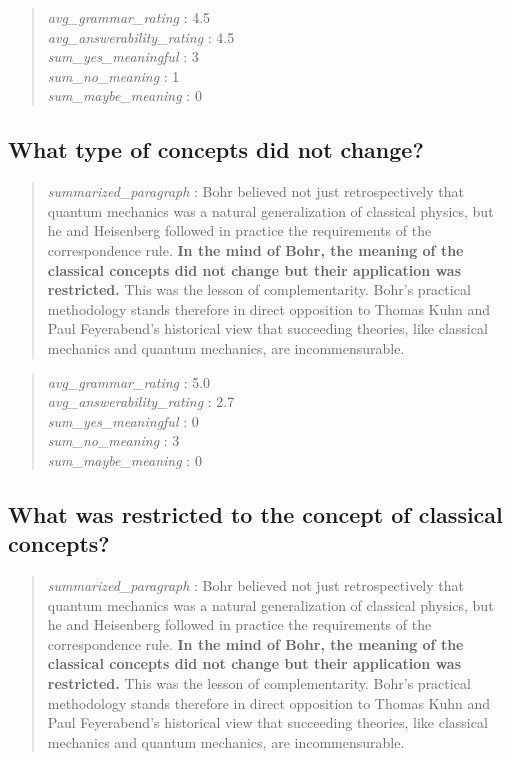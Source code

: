 \begin{quote}
\emph{avg\_grammar\_rating} : 4.5\\
\emph{avg\_answerability\_rating} : 4.5\\
\emph{sum\_yes\_meaningful} : 3\\
\emph{sum\_no\_meaning} : 1\\
\emph{sum\_maybe\_meaning} : 0
\end{quote}

\hypertarget{what-type-of-concepts-did-not-change}{%
\subsection{What type of concepts did not
change?}\label{what-type-of-concepts-did-not-change}}

\begin{quote}
\emph{summarized\_paragraph} : Bohr believed not just retrospectively
that quantum mechanics was a natural generalization of classical
physics, but he and Heisenberg followed in practice the requirements of
the correspondence rule. \textbf{In the mind of Bohr, the meaning of the
classical concepts did not change but their application was restricted.}
This was the lesson of complementarity. Bohr's practical methodology
stands therefore in direct opposition to Thomas Kuhn and Paul
Feyerabend's historical view that succeeding theories, like classical
mechanics and quantum mechanics, are incommensurable.
\end{quote}

\begin{quote}
\emph{avg\_grammar\_rating} : 5.0\\
\emph{avg\_answerability\_rating} : 2.7\\
\emph{sum\_yes\_meaningful} : 0\\
\emph{sum\_no\_meaning} : 3\\
\emph{sum\_maybe\_meaning} : 0
\end{quote}

\hypertarget{what-was-restricted-to-the-concept-of-classical-concepts}{%
\subsection{What was restricted to the concept of classical
concepts?}\label{what-was-restricted-to-the-concept-of-classical-concepts}}

\begin{quote}
\emph{summarized\_paragraph} : Bohr believed not just retrospectively
that quantum mechanics was a natural generalization of classical
physics, but he and Heisenberg followed in practice the requirements of
the correspondence rule. \textbf{In the mind of Bohr, the meaning of the
classical concepts did not change but their application was restricted.}
This was the lesson of complementarity. Bohr's practical methodology
stands therefore in direct opposition to Thomas Kuhn and Paul
Feyerabend's historical view that succeeding theories, like classical
mechanics and quantum mechanics, are incommensurable.
\end{quote}

